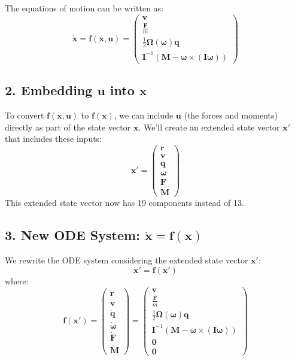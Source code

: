 \documentclass{article}
\begin{document}
The equations of motion can be written as:
\[
\dot{\mathbf{x}} = \mathbf{f}(\mathbf{x}, \mathbf{u}) =
\begin{pmatrix}
\mathbf{v} \\
\frac{\mathbf{F}}{m} \\
\frac{1}{2} \mathbf{\Omega}(\boldsymbol{\omega}) \mathbf{q} \\
\mathbf{I}^{-1} \left( \mathbf{M} - \boldsymbol{\omega} \times (\mathbf{I} \boldsymbol{\omega}) \right)
\end{pmatrix}
\]

\subsection*{2. Embedding \(\mathbf{u}\) into \(\mathbf{x}\)}

To convert \(\mathbf{f}(\mathbf{x}, \mathbf{u})\) to \(\mathbf{f}(\mathbf{x})\), we can include \(\mathbf{u}\) (the forces and moments) directly as part of the state vector \(\mathbf{x}\). We'll create an extended state vector \(\mathbf{x}'\) that includes these inputs:
\[
\mathbf{x}' = \begin{pmatrix} \mathbf{r} \\ \mathbf{v} \\ \mathbf{q} \\ \boldsymbol{\omega} \\ \mathbf{F} \\ \mathbf{M} \end{pmatrix}
\]
This extended state vector now has 19 components instead of 13.

\subsection*{3. New ODE System: \(\dot{\mathbf{x}} = \mathbf{f}(\mathbf{x})\)}

We rewrite the ODE system considering the extended state vector \(\mathbf{x}'\):
\[
\dot{\mathbf{x}}' = \mathbf{f}(\mathbf{x}')
\]
where:
\[
\mathbf{f}(\mathbf{x}') =
\begin{pmatrix}
\dot{\mathbf{r}} \\ \dot{\mathbf{v}} \\ \dot{\mathbf{q}} \\ \dot{\boldsymbol{\omega}} \\ \dot{\mathbf{F}} \\ \dot{\mathbf{M}}
\end{pmatrix}
=
\begin{pmatrix}
\mathbf{v} \\
\frac{\mathbf{F}}{m} \\
\frac{1}{2} \mathbf{\Omega}(\boldsymbol{\omega}) \mathbf{q} \\
\mathbf{I}^{-1} \left( \mathbf{M} - \boldsymbol{\omega} \times (\mathbf{I} \boldsymbol{\omega}) \right) \\
\mathbf{0} \\
\mathbf{0}
\end{pmatrix}
\]
\end{document}
